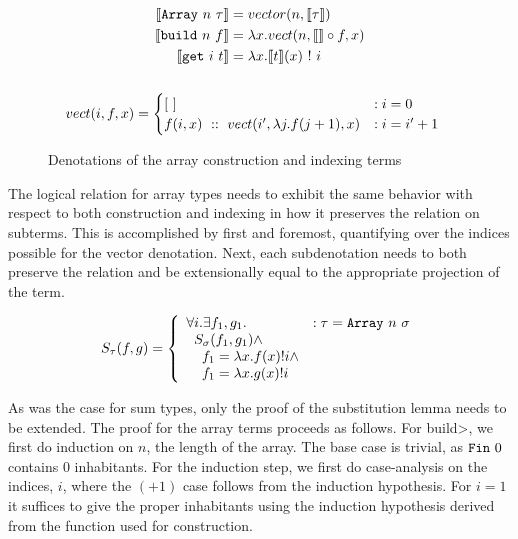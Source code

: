   \begin{figure}
    \begin{gather*}
      \begin{aligned}
      \llbracket \texttt{Array}\ n\ \tau \rrbracket &=
        vector(n, \llbracket \tau \rrbracket) \\
      \llbracket \texttt{build}\ n\ f \rrbracket &=
        \lambda x.
        vect(n, \llbracket \rrbracket \circ f, x) \\
      \llbracket \texttt{get}\ i\ t \rrbracket &=
        \lambda x. \llbracket t \rrbracket(x)\ !\ i \\
      \end{aligned}\\ \\
      \begin{aligned}
      vect(i, f, x) &=
        \begin{cases}
          [\ ]
            &: i = 0 \\
          f(i, x)\ ::\ vect(i', \lambda j. f(j + 1), x)
            &: i = i' + 1
        \end{cases}
      \end{aligned}
    \end{gather*}
    \caption{Denotations of the array construction and indexing terms}
    \label{eqn:denotation_array}
  \end{figure}

  The logical relation for array types needs to exhibit the same behavior with respect to both construction and indexing in how it preserves the relation on subterms.
  This is accomplished by first and foremost, quantifying over the indices possible for the vector denotation.
  Next, each subdenotation needs to both preserve the relation and be extensionally equal to the appropriate projection of the term.

  \begin{equation}
    S_\tau(f, g) =
      \left\{
        \begin{array}{ll}
          \forall i. \exists f_1, g_1.
            & : \tau = \texttt{Array}\ n\ \sigma \\
          \;\;S_\sigma(f_1, g_1) \wedge \\
          \;\;\;\;f_1 = \lambda x. f(x)!i \wedge \\
          \;\;\;\;f_1 = \lambda x. g(x)!i \\
        \end{array}
      \right.
  \label{eqn:lr_array}
  \end{equation}

  As was the case for sum types, only the proof of the substitution lemma needs to be extended.
  The proof for the array terms proceeds as follows.
  For \<build>, we first do induction on $n$, the length of the array.
  The base case is trivial, as $\texttt{Fin}\ 0$ contains $0$ inhabitants.
  For the induction step, we first do case-analysis on the indices, $i$, where the $(+1)$ case follows from the induction hypothesis.
  For $i=1$ it suffices to give the proper inhabitants using the induction hypothesis derived from the function used for construction.
